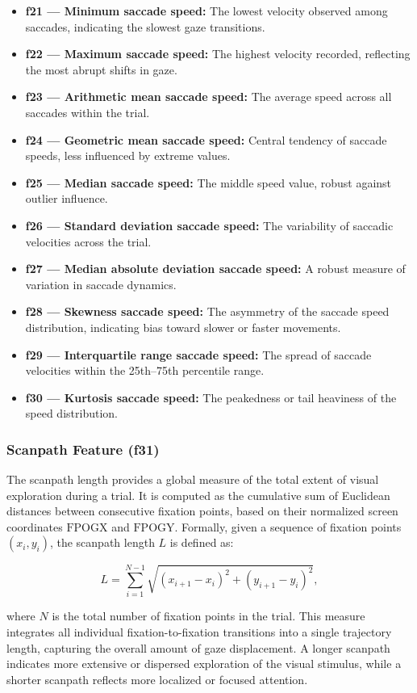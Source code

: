 \documentclass{article}
\begin{document}
\begin{itemize}
    \item \textbf{f21 — Minimum saccade speed:} The lowest velocity observed among saccades, indicating the slowest gaze transitions.
    \item \textbf{f22 — Maximum saccade speed:} The highest velocity recorded, reflecting the most abrupt shifts in gaze.
    \item \textbf{f23 — Arithmetic mean saccade speed:} The average speed across all saccades within the trial.
    \item \textbf{f24 — Geometric mean saccade speed:} Central tendency of saccade speeds, less influenced by extreme values.
    \item \textbf{f25 — Median saccade speed:} The middle speed value, robust against outlier influence.
    \item \textbf{f26 — Standard deviation saccade speed:} The variability of saccadic velocities across the trial.
    \item \textbf{f27 — Median absolute deviation saccade speed:} A robust measure of variation in saccade dynamics.
    \item \textbf{f28 — Skewness saccade speed:} The asymmetry of the saccade speed distribution, indicating bias toward slower or faster movements.
    \item \textbf{f29 — Interquartile range saccade speed:} The spread of saccade velocities within the 25th–75th percentile range.
    \item \textbf{f30 — Kurtosis saccade speed:} The peakedness or tail heaviness of the speed distribution.
\end{itemize}


\subsubsection{Scanpath Feature (f31)}

The scanpath length provides a global measure of the total extent of visual exploration during a trial. 
It is computed as the cumulative sum of Euclidean distances between consecutive fixation points, based on their normalized screen coordinates \(\mathrm{FPOGX}\) and \(\mathrm{FPOGY}\). 
Formally, given a sequence of fixation points \((x_i, y_i)\), the scanpath length \(L\) is defined as:

\[
L = \sum_{i=1}^{N-1} \sqrt{(x_{i+1} - x_i)^2 + (y_{i+1} - y_i)^2},
\]

where \(N\) is the total number of fixation points in the trial. 
This measure integrates all individual fixation-to-fixation transitions into a single trajectory length, capturing the overall amount of gaze displacement. 
A longer scanpath indicates more extensive or dispersed exploration of the visual stimulus, while a shorter scanpath reflects more localized or focused attention.
\end{document}
